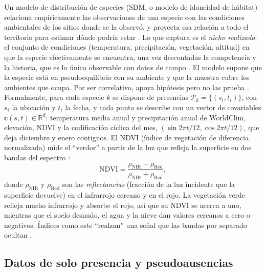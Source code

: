 Un modelo de distribución de especies (SDM, o modelo de idoneidad de
hábitat) relaciona empíricamente las observaciones de una especie con las
condiciones ambientales de los sitios donde se la observó, y proyecta esa
relación a todo el territorio para estimar dónde podría estar
\citep[p.~11]{guisan2017hsdm}. Lo que captura es el \emph{nicho realizado}:
el conjunto de condiciones (temperatura, precipitación, vegetación,
altitud) en que la especie efectivamente se encuentra, una vez descontadas
la competencia y la historia, que es lo único observable con datos de campo
\citep[pp.~32, 36]{guisan2017hsdm}. El modelo supone que la especie está en
pseudoequilibrio con su ambiente y que la muestra cubre los ambientes que
ocupa. Por ser correlativo, apoya hipótesis pero no las prueba
\citep[pp.~46, 53]{guisan2017hsdm}. Formalmente, para cada especie $k$ se
dispone de presencias $\mathcal{P}_k = \{(s_i, t_i)\}$, con $s_i$ la
ubicación y $t_i$ la fecha, y cada punto se describe con un vector de
covariables $\mathbf{c}(s, t) \in \mathbb{R}^d$: temperatura media anual y
precipitación anual de WorldClim, elevación, NDVI y la codificación cíclica
del mes, $(\sin 2\pi t/12, \cos 2\pi t/12)$, que deja diciembre y enero
contiguos. El NDVI (índice de vegetación de diferencia normalizada) mide el
``verdor'' a partir de la luz que refleja la superficie en dos bandas del
espectro \citep{tucker1979ndvi}:
\begin{equation}
  \mathrm{NDVI} = \frac{\rho_{\mathrm{NIR}} - \rho_{\mathrm{Red}}}{\rho_{\mathrm{NIR}} + \rho_{\mathrm{Red}}},
  \label{eq:ndvi}
\end{equation}
donde $\rho_{\mathrm{NIR}}$ y $\rho_{\mathrm{Red}}$ son las \emph{reflectancias}
(fracción de la luz incidente que la superficie devuelve) en el infrarrojo
cercano y en el rojo. La vegetación verde refleja mucho infrarrojo y absorbe
el rojo, así que su NDVI se acerca a uno, mientras que el suelo desnudo, el
agua y la nieve dan valores cercanos a cero o negativos. Índices como este
``realzan'' una señal que las bandas por separado ocultan
\citep[p.~98]{guisan2017hsdm}.

\subsection{Datos de solo presencia y pseudoausencias}

